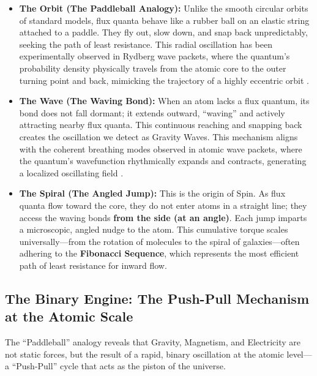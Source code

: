 \documentclass[11pt, a4paper]{article}
\begin{document}
\begin{itemize}
  \item \textbf{The Orbit (The Paddleball Analogy):} Unlike the smooth circular orbits of standard models, flux quanta behave like a rubber ball on an elastic string attached to a paddle. They fly out, slow down, and snap back unpredictably, seeking the path of least resistance. This radial oscillation has been experimentally observed in Rydberg wave packets, where the quantum's probability density physically travels from the atomic core to the outer turning point and back, mimicking the trajectory of a highly eccentric orbit \cite{chen1999}.
  
  \item \textbf{The Wave (The Waving Bond):} When an atom lacks a flux quantum, its bond does not fall dormant; it extends outward, ``waving'' and actively attracting nearby flux quanta. This continuous reaching and snapping back creates the oscillation we detect as Gravity Waves. This mechanism aligns with the coherent breathing modes observed in atomic wave packets, where the quantum's wavefunction rhythmically expands and contracts, generating a localized oscillating field \cite{chen1999}.
  
  \item \textbf{The Spiral (The Angled Jump):} This is the origin of Spin. As flux quanta flow toward the core, they do not enter atoms in a straight line; they access the waving bonds \textbf{from the side (at an angle)}. Each jump imparts a microscopic, angled nudge to the atom. This cumulative torque scales universally—from the rotation of molecules to the spiral of galaxies—often adhering to the \textbf{Fibonacci Sequence}, which represents the most efficient path of least resistance for inward flow.
\end{itemize}

\subsection{The Binary Engine: The Push-Pull Mechanism at the Atomic Scale}

  The ``Paddleball'' analogy reveals that Gravity, Magnetism, and Electricity are not static forces, but the result of a rapid, binary oscillation at the atomic level---a ``Push-Pull'' cycle that acts as the piston of the universe.
\end{document}
